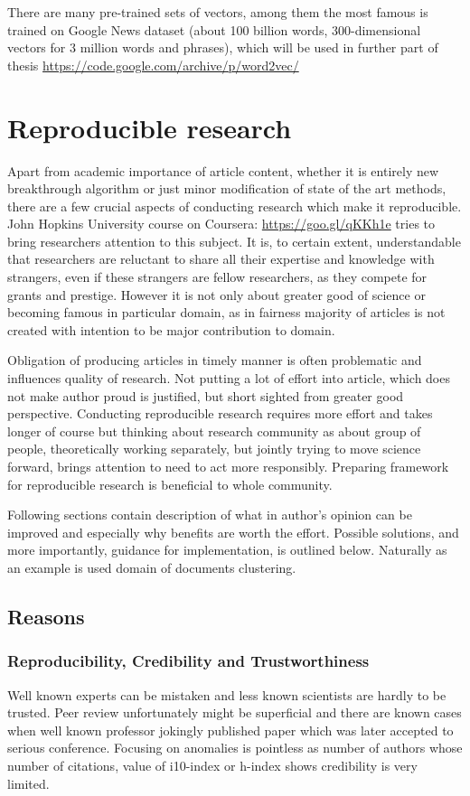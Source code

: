 \documentclass[a4paper, 12pt, oneside]{Thesis} %
\begin{document}
There are many pre-trained sets of vectors, among them the most famous is trained on Google News dataset (about 100 billion words, 300-dimensional vectors for 3 million words and phrases), which will be used in further part of thesis \url{https://code.google.com/archive/p/word2vec/}

\chapter{Reproducible research} Apart from academic importance of article content, whether it is entirely new breakthrough algorithm or just minor modification of state of the art methods, there are a few crucial aspects of conducting research which make it reproducible. John Hopkins University course on Coursera: \url{https://goo.gl/qKKh1e} tries to bring researchers attention to this subject. It is, to certain extent, understandable that researchers are reluctant to share all their expertise and knowledge with strangers, even if these strangers are fellow researchers, as they compete for grants and prestige. However it is not only about greater good of science or becoming famous in particular domain, as in fairness majority of articles is not created with intention to be major contribution to domain. 

Obligation of producing articles in timely manner is often problematic and influences quality of research. Not putting a lot of effort into article, which does not make author proud is justified, but short sighted from greater good perspective. Conducting reproducible research requires more effort and takes longer of course but thinking about research community as about group of people, theoretically working separately, but jointly trying to move science forward, brings attention to need to act more responsibly. Preparing framework for reproducible research is beneficial to whole community. 

Following sections contain description of what in author's opinion can be improved and especially why benefits are worth the effort. Possible solutions, and more importantly, guidance for implementation, is outlined below. Naturally as an example is used domain of documents clustering.

\section{Reasons} 

\subsection{Reproducibility, Credibility and Trustworthiness} Well known experts can be mistaken and less known scientists are hardly to be trusted. Peer review unfortunately might be superficial and there are known cases when well known professor jokingly published paper which was later accepted to serious conference. Focusing on anomalies is pointless as number of authors whose number of citations, value of i10-index or h-index shows credibility is very limited.
\end{document}
